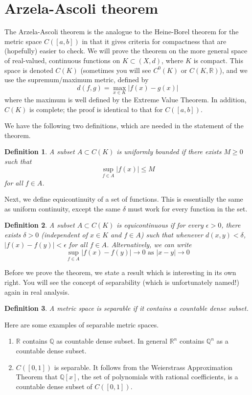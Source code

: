 \documentclass[10pt]{article}         %
\newtheorem{definition}{Definition}[section]
\theoremstyle{remark}
\newcommand{\R}{\mathbb{R}}
\newcommand{\Q}{\mathbb{Q}}
\begin{document}
\section{Arzela-Ascoli theorem}

The Arzela-Ascoli theorem is the analogue to the Heine-Borel theorem for the metric space $C([a,b])$ in that it gives criteria for compactness that are (hopefully) easier to check. We will prove the theorem on the more general space of real-valued, continuous functions on $K \subset (X, d)$, where $K$ is compact. This space is denoted $C(K)$  (sometimes you will see $C^0(K)$ or $C(K, \R)$), and we use the supremum/maximum metric, defined by
\[
d(f, g) = \max_{x \in K}|f(x) - g(x)|
\]
where the maximum is well defined by the Extreme Value Theorem. In addition, $C(K)$ is complete; the proof is identical to that for $C([a,b])$. 

We have the following two definitions, which are needed in the statement of the theorem.

\begin{definition}
A subset $A \subset C(K)$ is \emph{uniformly bounded} if there exists $M \geq 0$ such that
\[
\sup_{f \in A}|f(x)| \leq M
\]
for all $f \in A$.
\end{definition}

Next, we define equicontinuity of a set of functions. This is essentially the same as uniform continuity, except the same $\delta$ must work for every function in the set.

\begin{definition}
A subset $A \subset C(K)$ is \emph{equicontinuous} if for every $\epsilon > 0$, there exists $\delta > 0$ (independent of $x \in K$ and $f \in A$) such that whenever $d(x,y) < \delta$,  $|f(x) - f(y)| < \epsilon$ for all $f \in A$. Alternatively, we can write
\[
\sup_{f\in A}|f(x) - f(y)| \rightarrow 0 \text{ as } |x - y| \rightarrow 0
\]
\end{definition}

Before we prove the theorem, we state a result which is interesting in its own right. You will see the concept of separability (which is unfortunately named!) again in real analysis.

\begin{definition}
A metric space is \emph{separable} if it contains a countable dense subset.
\end{definition}

Here are some examples of separable metric spaces.
\begin{enumerate}
    \item $\R$ contains $\Q$ as countable dense subset. In general $\R^n$ contains $\Q^n$ as a countable dense subset.
    \item $C([0,1])$ is separable. It follows from the Weierstrass Approximation Theorem that $\Q[x]$, the set of polynomials with rational coefficients, is a countable dense subset of $C([0,1])$.
\end{enumerate}
\end{document}
